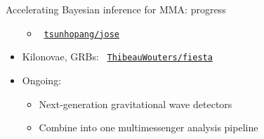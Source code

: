 \documentclass[usenames,dvipsnames,t]{beamer}
\begin{document}
\begin{frame}{Accelerating Bayesian inference for MMA: progress}
\begin{itemize}
\begin{itemize}
      \vspace{\y}
      
      \item \faGithub~\href{https://github.com/tsunhopang/jose}{\texttt{tsunhopang/jose}}
    \end{itemize}

    \vspace{\x}

    \item Kilonovae, GRBs: \faGithub~\href{https://github.com/ThibeauWouters/fiesta}{\texttt{ThibeauWouters/fiesta}}

    \vspace{\x}

    \item Ongoing: 
    \vspace{\y}
    \begin{itemize}
      \item Next-generation gravitational wave detectors
      
      \vspace{\y}

      \item Combine into one multimessenger analysis pipeline
    \end{itemize}
  \end{itemize}


\end{frame}
\end{document}
